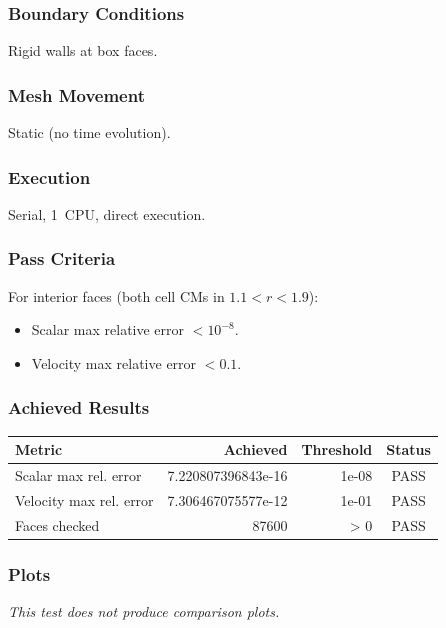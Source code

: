 \documentclass[11pt,a4paper]{article}
\begin{document}
\subsubsection*{Boundary Conditions}
Rigid walls at box faces.

\subsubsection*{Mesh Movement}
Static (no time evolution).

\subsubsection*{Execution}
Serial, 1~CPU, direct execution.

\subsubsection*{Pass Criteria}
For interior faces (both cell CMs in $1.1 < r < 1.9$):
\begin{itemize}
  \item Scalar max relative error $< 10^{-8}$.
  \item Velocity max relative error $< 0.1$.
\end{itemize}

\subsubsection*{Achieved Results}
\begin{table}[htbp]
\centering
\begin{tabular}{l r r c}
\toprule
\textbf{Metric} & \textbf{Achieved} & \textbf{Threshold} & \textbf{Status} \\
\midrule
Scalar max rel. error & 7.220807396843e-16 & 1e-08 & {\color{green!60!black}PASS} \\
Velocity max rel. error & 7.306467075577e-12 & 1e-01 & {\color{green!60!black}PASS} \\
Faces checked & 87600 & > 0 & {\color{green!60!black}PASS} \\
\bottomrule
\end{tabular}
\end{table}

\subsubsection*{Plots}
\textit{This test does not produce comparison plots.}
\end{document}
